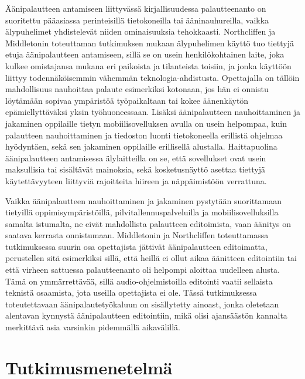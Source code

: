 \documentclass[utf8]{gradu3}
\begin{document}
Äänipalautteen antamiseen liittyvässä kirjallisuudessa palautteenanto on suoritettu pääasiassa perinteisillä tietokoneilla tai ääninauhureilla, vaikka älypuhelimet yhdistelevät niiden ominaisuuksia tehokkaasti. Northcliffen ja Middletonin \parencite{smartphone} toteuttaman tutkimuksen mukaan älypuhelimen käyttö tuo tiettyjä etuja äänipalautteen antamiseen, sillä se on usein henkilökohtainen laite, joka kulkee omistajansa mukana eri paikoista ja tilanteista toisiin, ja jonka käyttöön liittyy todennäköisemmin vähemmän teknologia-ahdistusta. Opettajalla on tällöin mahdollisuus nauhoittaa palaute esimerkiksi kotonaan, jos hän ei onnistu löytämään sopivaa ympäristöä työpaikaltaan tai kokee äänenkäytön epämiellyttäväksi yksin työhuoneessaan. Lisäksi äänipalautteen nauhoittaminen ja jakaminen oppilaille tietyn mobiilisovelluksen avulla on usein helpompaa, kuin palautteen nauhoittaminen ja tiedoston luonti tietokoneella erillistä ohjelmaa hyödyntäen, sekä sen jakaminen oppilaille erillisellä alustalla. Haittapuolina äänipalautteen antamisessa älylaitteilla on se, että sovellukset ovat usein maksullisia tai sisältävät mainoksia, sekä kosketusnäyttö asettaa tiettyjä käytettävyyteen liittyviä rajoitteita hiireen ja näppäimistöön verrattuna.

Vaikka äänipalautteen nauhoittaminen ja jakaminen pystytään suorittamaan tietyillä oppimisympäristöillä, pilvitallennuspalveluilla ja mobiilisovelluksilla samalta istumalta, ne eivät mahdollista palautteen editoimista, vaan äänitys on saatava kerrasta onnistumaan. Middletonin ja Northcliffen \parencite{principles} toteuttamassa tutkimuksessa suurin osa opettajista jättivät äänipalautteen editoimatta, perustellen sitä esimerkiksi sillä, että heillä ei ollut aikaa äänitteen editointiin tai että virheen sattuessa palautteenanto oli helpompi aloittaa uudelleen alusta. Tämä on ymmärrettävää, sillä audio-ohjelmistoilla editointi vaatii sellaista teknistä osaamista, jota useilla opettajista ei ole. Tässä tutkimuksessa toteutettavaan äänipalautetyökaluun on sisällytetty ainoast, jonka oletetaan alentavan kynnystä äänipalautteen editointiin, mikä olisi ajansäästön kannalta merkittävä asia varsinkin pidemmällä aikavälillä.

%

\chapter{Tutkimusmenetelmä}
\end{document}
